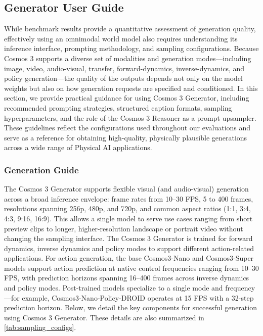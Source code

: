 \subsection{Generator User Guide}

While benchmark results provide a quantitative assessment of generation quality, effectively using an omnimodal world model also requires understanding its inference interface, prompting methodology, and sampling configurations. Because Cosmos 3 supports a diverse set of modalities and generation modes—including image, video, audio-visual, transfer, forward-dynamics, inverse-dynamics, and policy generation—the quality of the outputs depends not only on the model weights but also on how generation requests are specified and conditioned. In this section, we provide practical guidance for using Cosmos 3 Generator, including recommended prompting strategies, structured caption formats, sampling hyperparameters, and the role of the Cosmos 3 Reasoner as a prompt upsampler. These guidelines reflect the configurations used throughout our evaluations and serve as a reference for obtaining high-quality, physically plausible generations across a wide range of Physical AI applications.

\subsubsection{Generation Guide}
\label{sec::gen_guide}

The Cosmos 3 Generator supports flexible visual (and audio-visual) generation across a broad inference envelope: frame rates from 10–30 FPS, 5 to 400 frames, resolutions spanning 256p, 480p, and 720p, and common aspect ratios (1:1, 3:4, 4:3, 9:16, 16:9). This allows a single model to serve use cases ranging from short preview clips to longer, higher-resolution landscape or portrait video without changing the sampling interface. The Cosmos 3 Generator is trained for forward dynamics, inverse dynamics and policy modes to support different action-related applications. For action generation, the base Cosmos3-Nano and Cosmos3-Super models support action prediction at native control frequencies ranging from 10–30 FPS, with prediction horizons spanning 16–400 frames across inverse dynamics and policy modes. Post-trained models specialize to a single mode and frequency---for example, Cosmos3-Nano-Policy-DROID operates at 15 FPS with a 32-step prediction horizon. Below, we detail the key components for successful generation using Cosmos 3 Generator. These details are also summarized in \cref{tab:sampling_configs}.

